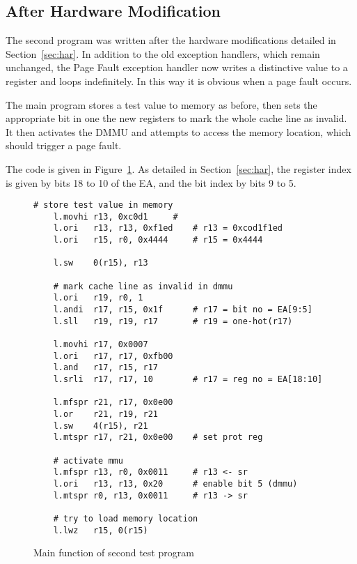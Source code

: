 \subsection{After Hardware Modification}
The second program was written after the hardware modifications detailed in Section~\ref{sec:har}. In addition to the old exception handlers, which remain unchanged, the Page Fault exception handler now writes a distinctive value to a register and loops indefinitely. In this way it is obvious when a page fault occurs.

The main program stores a test value to memory as before, then sets the appropriate bit in one the new registers to mark the whole cache line as invalid. It then activates the DMMU and attempts to access the memory location, which should trigger a page fault.

The code is given in Figure~\ref{fig:mn2}. As detailed in Section~\ref{sec:har}, the register index is given by bits 18 to 10 of the EA, and the bit index by bits 9 to 5.

\begin{figure}[t]
  \centering
  \begin{lstlisting}[language={[x86masm]Assembler}]
	# store test value in memory
	l.movhi	r13, 0xc0d1		#
	l.ori	r13, r13, 0xf1ed	# r13 = 0xcod1f1ed
	l.ori	r15, r0, 0x4444		# r15 = 0x4444
	
	l.sw	0(r15), r13
	
	# mark cache line as invalid in dmmu
	l.ori	r19, r0, 1
	l.andi	r17, r15, 0x1f		# r17 = bit no = EA[9:5]
	l.sll	r19, r19, r17		# r19 = one-hot(r17)

	l.movhi r17, 0x0007
	l.ori	r17, r17, 0xfb00
	l.and	r17, r15, r17
	l.srli	r17, r17, 10		# r17 = reg no = EA[18:10]

	l.mfspr	r21, r17, 0x0e00
	l.or	r21, r19, r21
	l.sw	4(r15), r21
	l.mtspr	r17, r21, 0x0e00	# set prot reg

	# activate mmu
	l.mfspr	r13, r0, 0x0011		# r13 <- sr
	l.ori	r13, r13, 0x20		# enable bit 5 (dmmu)
	l.mtspr	r0, r13, 0x0011		# r13 -> sr
	
	# try to load memory location
	l.lwz	r15, 0(r15)
	\end{lstlisting}
  \caption{Main function of second test program}
  \label{fig:mn2}
\end{figure}